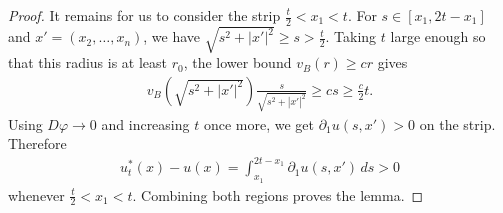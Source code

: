 \documentclass[10pt,a4paper]{amsart}
\begin{document}
\begin{proof}
		It remains for us to consider the strip $\frac{t}{2}<x_1<t$.  For
		$s\in[x_1,2t-x_1]$ and $x'=(x_2,\ldots,x_n)$, we have
		$\sqrt{s^2+|x'|^2}\ge s>\frac{t}{2}$.  Taking $t$ large enough so that this
		radius is at least $r_0$, the lower bound $v_B(r)\ge cr$ gives
		\begin{align*}
			v_B\left(\sqrt{s^2+|x'|^2}\right)
			\frac{s}{\sqrt{s^2+|x'|^2}}
			\ge
			cs
			\ge
			\frac{c}{2}t .
		\end{align*}
		Using $D\varphi\to0$ and increasing $t$ once more, we get
		$\partial_1u(s,x')>0$ on the strip.  Therefore
		\begin{align*}
			u_t^*(x)-u(x)
			=
			\int_{x_1}^{2t-x_1}\partial_1u(s,x')\,ds
			>
			0
		\end{align*}
		whenever $\frac{t}{2}<x_1<t$.  Combining both regions proves the lemma.
	\end{proof}
\end{document}
